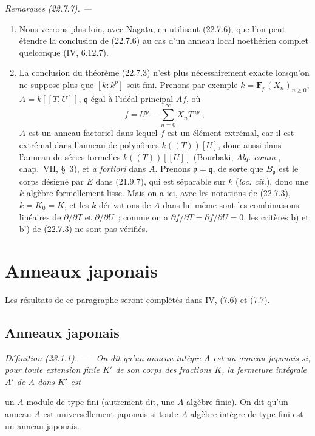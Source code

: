 \documentclass[10pt,oneside]{book}
\makeatletter
\newcommand{\setmanualcurrentlabel}[1]{\def\@currentlabel{#1}}
\newcommand{\oldpage}[2][]{%
  \setcounter{footnote}{0}%
  \marginpar{\scriptsize\textbf{#1}~|~#2}\ignorespaces}
\newenvironment{definition}[1][]{%
  \setmanualcurrentlabel{#1}\par\medskip\noindent\itshape Définition (#1). ---\ }{\par}
\newenvironment{remarks}[1][]{%
  \setmanualcurrentlabel{#1}\par\medskip\noindent\itshape Remarques (#1). ---\ }{\par}
\makeatother
\begin{document}
\begin{remarks}[22.7.7]
\label{0.22.7.7-fr}
\begin{enumerate}
  \item[(i)] Nous verrons plus loin, avec Nagata, en utilisant (22.7.6), que
  l'on peut étendre la conclusion de (22.7.6) au cas d'un anneau local
  noethérien complet quelconque (IV, 6.12.7).

  \item[(ii)] La conclusion du théorème (22.7.3) n'est plus nécessairement
  exacte lorsqu'on ne suppose plus que $[k:k^p]$ soit fini. Prenons par
  exemple $k=\mathbf F_p(X_n)_{n\geqslant0}$,
  $A=k[[T,U]]$, $\mathfrak q$ égal à l'idéal principal $Af$, où
  \[
    f=U^p-\sum_{n=0}^{\infty}X_nT^{np}~;
  \]
  $A$ est un anneau factoriel dans lequel $f$ est un élément extrémal, car il
  est extrémal dans l'anneau de polynômes $k((T))[U]$, donc aussi dans
  l'anneau de séries formelles $k((T))[[U]]$ (Bourbaki,
  \emph{Alg. comm.}, chap.~VII, §~3), et \emph{a fortiori} dans $A$.
  Prenons $\mathfrak p=\mathfrak q$, de sorte que $B_{\mathfrak p}$ est le
  corps désigné par $E$ dans (21.9.7), qui est séparable sur $k$
  (\emph{loc. cit.}), donc une $k$-algèbre formellement lisse. Mais on a ici,
  avec les notations de (22.7.3), $k=K_0=K$, et les $k$-dérivations de $A$
  dans lui-même sont les combinaisons linéaires de $\partial/\partial T$ et
  $\partial/\partial U$~; comme on a
  $\partial f/\partial T=\partial f/\partial U=0$, les critères b) et b') de
  (22.7.3) ne sont pas vérifiés.
\end{enumerate}
\end{remarks}


%
\section{Anneaux japonais}
\label{section:0.23-fr}

Les résultats de ce paragraphe seront complétés dans IV, (7.6) et (7.7).

\subsection{Anneaux japonais}
\label{subsection:0.23.1-fr}

\begin{definition}[23.1.1]
\label{0.23.1.1-fr}
On dit qu'un anneau intègre $A$ est un anneau japonais si, pour toute
extension finie $K'$ de son corps des fractions $K$, la fermeture intégrale
$A'$ de $A$ dans $K'$ est

\oldpage[0\textsubscript{IV-1}]{214}

un $A$-module de type fini (autrement dit, une $A$-algèbre finie). On dit
qu'un anneau $A$ est universellement japonais si toute $A$-algèbre intègre de
type fini est un anneau japonais.
\end{definition}
\end{document}
